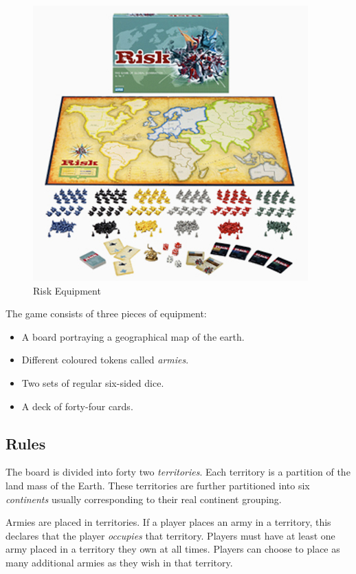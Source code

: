 \documentclass[parskip]{cs4rep}
\begin{document}
\begin{figure}[h]
\centering
\includegraphics{images/risk-board}
\caption{Risk Equipment \cite{riskimage}}
\label{fig:risk-equipment}
\end{figure}

The game consists of three pieces of equipment:

\begin{itemize}
\item
A board portraying a geographical map of the earth.
\item
Different coloured tokens called \textit{armies}.
\item
Two sets of regular six-sided dice.
\item
A deck of forty-four cards.
\end{itemize}

\subsection{Rules}

The board is divided into forty two \textit{territories}. Each territory is a partition of the land mass of the Earth. These territories are further partitioned into six \textit{continents} usually corresponding to their real continent grouping.

Armies are placed in territories. If a player places an army in a territory, this declares that the player \textit{occupies} that territory. Players must have at least one army placed in a territory they own at all times. Players can choose to place as many additional armies as they wish in that territory.
\end{document}

